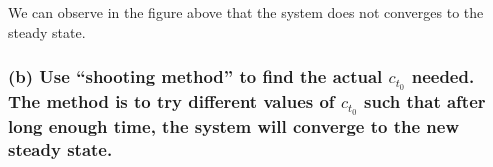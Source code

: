 \documentclass[10pt,notitlepage,onecolumn,aps,pra]{revtex4-1}
\begin{document}
    We can observe in the figure above that the system does not converges to
the steady state.

    \hypertarget{b-use-shooting-method-to-find-the-actual-c_t_0-needed.-the-method-is-to-try-different-values-of-c_t_0-such-that-after-long-enough-time-the-system-will-converge-to-the-new-steady-state.}{%
\subsubsection{\texorpdfstring{(b) Use ``shooting method'' to find the
actual \(c_{t_{0}}\) needed. The method is to try different values of
\(c_{t_{0}}\) such that after long enough time, the system will converge
to the new steady
state.}{(b) Use ``shooting method'' to find the actual c\_\{t\_\{0\}\} needed. The method is to try different values of c\_\{t\_\{0\}\} such that after long enough time, the system will converge to the new steady state.}}\label{b-use-shooting-method-to-find-the-actual-c_t_0-needed.-the-method-is-to-try-different-values-of-c_t_0-such-that-after-long-enough-time-the-system-will-converge-to-the-new-steady-state.}}
\end{document}

